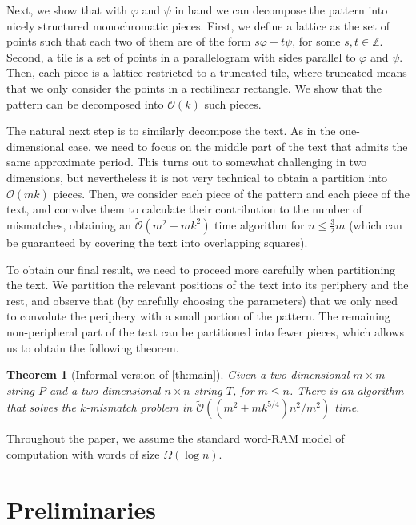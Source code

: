 \documentclass[11pt, letterpaper]{article}
\theoremstyle{plain}
\newtheorem{theorem}{Theorem}
\theoremstyle{definition}
\theoremstyle{remark}
\newcommand{\Z}{\mathbb{Z}}
\renewcommand{\O}{\mathcal{O}}
\newcommand{\tO}{\tilde{\mathcal{O}}}
\renewcommand{\phi}{\varphi}
\begin{document}
Next, we show that with $\phi$ and $\psi$ in hand we can decompose the pattern
into nicely structured monochromatic pieces. First, we define a lattice as the set of points such that each two of them
are of the form $s\phi+t\psi$, for some $s,t\in \Z$. Second, a tile is a set of points in a parallelogram with sides
parallel to $\phi$ and $\psi$. Then, each piece is a lattice restricted to a truncated tile, where truncated
means that we only consider the points in a rectilinear rectangle. We show that the pattern
can be decomposed into $\O(k)$ such pieces.

The natural next step is to similarly decompose the text. As in the one-dimensional case, we
need to focus on the middle part of the text that admits the same approximate period. This turns out
to somewhat challenging in two dimensions, but nevertheless it is not very technical to obtain
a partition into $\O(mk)$ pieces. Then, we consider each piece of the pattern and each piece of the text,
and convolve them to calculate their contribution to the number of mismatches, obtaining an $\tO(m^{2}+mk^{2})$ time
algorithm for $n\leq \frac{3}{2}m$ (which can be guaranteed by covering the text into overlapping
squares).

To obtain our final result, we need to proceed more carefully when partitioning the text. We partition
the relevant positions of the text into its periphery and the rest, and observe that (by carefully choosing the parameters)
that we only need to convolute the periphery with a small portion of the pattern. The remaining non-peripheral
part of the text can be partitioned into fewer pieces, which allows us to obtain the following theorem.

\begin{theorem}[Informal version of \cref{th:main}]
Given a two-dimensional $m \times m$ string $P$ and a two-dimensional $n \times n$ string $T$, for $m \le n$.
There is an algorithm that solves the $k$-mismatch problem in $\tO((m^2 + mk^{5/4})n^2 / m^2)$ time.
\end{theorem}

\noindent Throughout the paper, we assume the standard word-RAM model of computation with words of size $\Omega(\log n)$.

\section{Preliminaries}
\label{sec:preliminaries}
\newcommand{\x}[1]{#1.x}
\newcommand{\y}[1]{#1.y}
\newcommand{\h}[1]{\phi \times #1}
\newcommand{\s}[1]{\psi \times #1}
\end{document}
